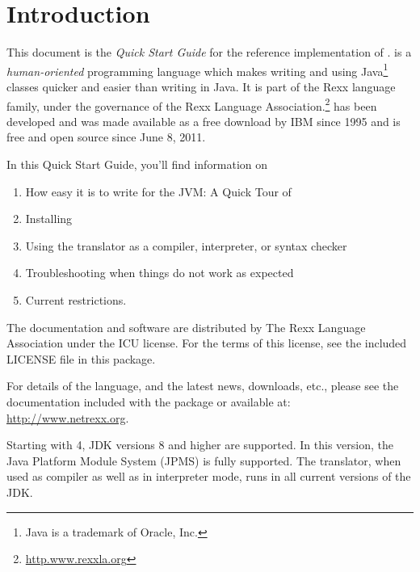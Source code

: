 \chapter{Introduction}
This document is the \emph{Quick Start Guide} for the reference implementation of
\nr{}. \nr{} is a \emph{human-oriented} programming language which makes
writing and using Java\footnote{Java is a trademark of Oracle, Inc.}
classes quicker and easier than writing in Java. It is part of the Rexx
language family, under the governance of the Rexx Language
Association.\footnote{\url{http.www.rexxla.org}} \nr{} has been
developed and was made available as a free download by IBM since 1995
and is free and open source since June 8, 2011.

In this Quick Start Guide, you’ll find information on
\begin{enumerate} 
\item How easy it is to write for the JVM: A Quick Tour of \nr{}
\item Installing \nr{} 
\item Using the \nr{} translator as a compiler, interpreter, or
  syntax checker 
\item Troubleshooting when things do not work as expected
\item Current restrictions.
\end{enumerate} 
The \nr{} documentation and software are distributed
by The Rexx Language Association under the \textsc{ICU} license. For
the terms of this license, see the included \textsc{LICENSE} file in
this package.

For details of the \nr{} language, and the latest news, downloads,
etc., please see the \nr{} documentation included with the package
or available at: \url{http://www.netrexx.org}.

\begin{shaded}\noindent
Starting with \nr{} 4, JDK versions 8 and higher are supported. In
this version, the Java Platform Module System (JPMS) is fully
supported. The translator, when used as compiler as well as in
interpreter mode, runs in all current versions of the JDK.
\end{shaded}\indent
